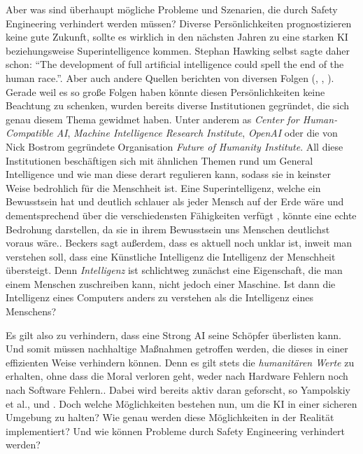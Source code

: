         Aber was sind überhaupt mögliche Probleme und Szenarien, die durch Safety Engineering verhindert werden müssen?
        Diverse Persönlichkeiten prognostizieren keine gute Zukunft, sollte es wirklich in den nächsten Jahren zu
        eine starken KI beziehungsweise Superintelligence kommen. Stephan Hawking selbst sagte daher schon: ``The development
        of full artificial intelligence could spell the end of the human race.''.\cite{cellan-jones_2014} Aber auch
        andere Quellen berichten von diversen Folgen (\cite[Bostrom]{bostrom_2014}, \cite[Beckers]{Beckers2018},
        \cite[Musk]{hern_2015}). Gerade weil es so große Folgen haben könnte diesen Persönlichkeiten keine Beachtung zu
        schenken, wurden bereits diverse Institutionen gegründet, die sich genau diesem Thema gewidmet haben. Unter anderem
        as \textit{Center for Human-Compatible AI}, \textit{Machine Intelligence Research Institute}, \textit{OpenAI} oder
        die von Nick Bostrom gegründete Organisation \textit{Future of Humanity Institute}. All diese Institutionen
        beschäftigen sich mit ähnlichen Themen rund um General Intelligence und wie man diese derart regulieren kann,
        sodass sie in keinster Weise bedrohlich für die Menschheit ist. Eine Superintelligenz, welche ein Bewusstsein hat
        und deutlich schlauer als jeder Mensch auf der Erde wäre und dementsprechend über die verschiedensten Fähigkeiten
        verfügt \cite{bostrom_2006}, könnte eine echte Bedrohung darstellen, da sie in ihrem Bewusstsein uns Menschen
        deutlichst voraus wäre.\cite{Beckers2018}. Beckers sagt außerdem, dass es aktuell noch unklar ist, inweit man
        verstehen soll, dass eine Künstliche Intelligenz die Intelligenz der Menschheit übersteigt.\cite[s. 237]{Beckers2018}
        Denn \textit{Intelligenz} ist schlichtweg zunächst eine Eigenschaft, die man einem Menschen zuschreiben kann,
        nicht jedoch einer Maschine. Ist dann die Intelligenz eines Computers anders zu verstehen als die Intelligenz
        eines Menschens?

        Es gilt also zu verhindern, dass eine Strong AI seine Schöpfer überlisten kann. Und somit müssen nachhaltige
        Maßnahmen getroffen werden, die dieses in einer effizienten Weise verhindern können. Denn es gilt stets die
        \textit{humanitären Werte} zu erhalten, ohne dass die Moral verloren geht, weder nach Hardware Fehlern noch
        nach Software Fehlern.\cite[s. 7]{yampolskiy2013safety}. Dabei wird bereits aktiv daran geforscht, so
        Yampolskiy et al.\citep{gordon1998}, \citep{GordonSpears2003} und \citep{Spears}. Doch welche Möglichkeiten
        bestehen nun, um die KI in einer sicheren Umgebung zu halten? Wie genau werden diese Möglichkeiten in der
        Realität implementiert? Und wie können Probleme durch Safety Engineering verhindert werden?


